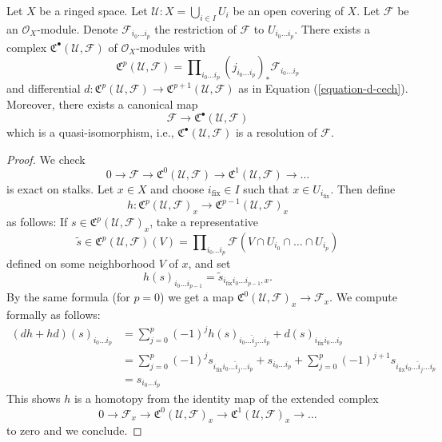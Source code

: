 \begin{lemma}
\label{lemma-covering-resolution}
Let $X$ be a ringed space. Let $\mathcal{U} : X = \bigcup_{i \in I} U_i$
be an open covering of $X$. Let $\mathcal{F}$ be an $\mathcal{O}_X$-module.
Denote $\mathcal{F}_{i_0 \ldots i_p}$ the restriction of
$\mathcal{F}$ to $U_{i_0 \ldots i_p}$. There exists a complex
${\mathfrak C}^\bullet(\mathcal{U}, \mathcal{F})$
of $\mathcal{O}_X$-modules with
$$
{\mathfrak C}^p(\mathcal{U}, \mathcal{F}) =
\prod\nolimits_{i_0 \ldots i_p}
(j_{i_0 \ldots i_p})_* \mathcal{F}_{i_0 \ldots i_p}
$$
and differential
$d : {\mathfrak C}^p(\mathcal{U}, \mathcal{F})
\to {\mathfrak C}^{p + 1}(\mathcal{U}, \mathcal{F})$
as in Equation (\ref{equation-d-cech}). Moreover, there exists a canonical
map
$$
\mathcal{F} \to {\mathfrak C}^\bullet(\mathcal{U}, \mathcal{F})
$$
which is a quasi-isomorphism, i.e.,
${\mathfrak C}^\bullet(\mathcal{U}, \mathcal{F})$
is a resolution of $\mathcal{F}$.
\end{lemma}

\begin{proof}
We check
$$
0 \to \mathcal{F} \to \mathfrak{C}^0(\mathcal{U}, \mathcal{F}) \to
\mathfrak{C}^1(\mathcal{U}, \mathcal{F}) \to  \ldots
$$
is exact on stalks. Let $x \in X$ and choose $i_{\text{fix}} \in I$
such that $x \in U_{i_{\text{fix}}}$. Then define 
$$
h : \mathfrak{C}^p(\mathcal{U}, \mathcal{F})_x
\to \mathfrak{C}^{p - 1}(\mathcal{U}, \mathcal{F})_x
$$
as follows: If $s \in \mathfrak{C}^p(\mathcal{U}, \mathcal{F})_x$, take
a representative
$$
\widetilde{s} \in
\mathfrak{C}^p(\mathcal{U}, \mathcal{F})(V) =
\prod\nolimits_{i_0 \ldots i_p}
\mathcal{F}(V \cap U_{i_0} \cap \ldots \cap U_{i_p})
$$
defined on some neighborhood $V$ of $x$, and set
$$
h(s)_{i_0 \ldots i_{p - 1}} =
\widetilde{s}_{i_{\text{fix}} i_0 \ldots i_{p - 1}, x}.
$$
By the same formula (for $p = 0$) we get a map
$\mathfrak{C}^{0}(\mathcal{U},\mathcal{F})_x \to \mathcal{F}_x$.
We compute formally as follows:
\begin{align*}
(dh + hd)(s)_{i_0 \ldots i_p}
& =
\sum\nolimits_{j = 0}^p
(-1)^j
h(s)_{i_0 \ldots \hat i_j \ldots i_p}
+
d(s)_{i_{\text{fix}} i_0 \ldots i_p}\\
& =
\sum\nolimits_{j = 0}^p
(-1)^j
s_{i_{\text{fix}} i_0 \ldots \hat i_j \ldots i_p}
+
s_{i_0 \ldots i_p}
+
\sum\nolimits_{j = 0}^p
(-1)^{j + 1}
s_{i_{\text{fix}} i_0 \ldots \hat i_j \ldots i_p} \\
& =
s_{i_0 \ldots i_p}
\end{align*}
This shows $h$ is a homotopy from the identity map of
the extended complex
$$
0 \to \mathcal{F}_x \to \mathfrak{C}^0(\mathcal{U}, \mathcal{F})_x
\to \mathfrak{C}^1(\mathcal{U}, \mathcal{F})_x \to \ldots
$$
to zero and we conclude.
\end{proof}

